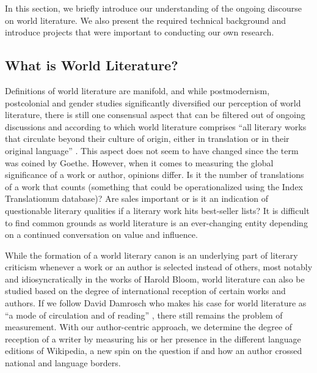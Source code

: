 \documentclass[a4paper,12pt]{scrartcl}
\begin{document}
In this section, we briefly introduce our understanding of the ongoing
discourse on world literature. We also present the required technical
background and introduce projects that were important to conducting
our own research.

\subsection{What is World Literature?}

Definitions of world literature are manifold,
and while postmodernism, postcolonial and gender studies
significantly diversified our perception of world literature,
there is still one consensual aspect that can be filtered
out of ongoing discussions and according to which world
literature comprises ``all literary works that
circulate beyond their culture of origin, either in translation
or in their original language'' \cite{damrosch2003what}.
This aspect does not seem to have changed since the term was
coined by Goethe. However, when it comes to measuring the
global significance of a work or author, opinions differ.
Is it the number of translations of a work that counts (something
that could be operationalized using the Index Translationum database)?
Are sales important or is it an indication of questionable literary
qualities if a literary work hits best-seller lists? It is difficult
to find common grounds as world literature is an ever-changing entity
depending on a continued conversation on value and influence.

While the formation of a world literary canon is an underlying
part of literary criticism whenever a work or an author is selected
instead of others, most notably and idiosyncratically in the works
of Harold Bloom, world literature can also be studied based on the
degree of international reception of certain works and authors.
If we follow David Damrosch who makes his case for world literature as
``a mode of circulation and of reading'' \cite{damrosch2003what},
there still remains the problem of measurement.
With our author-centric
approach, we determine the degree of reception of a writer by measuring
his or her presence in the different language editions of Wikipedia,
a new spin on the question if and how an author crossed national
and language borders.

\end{document}
